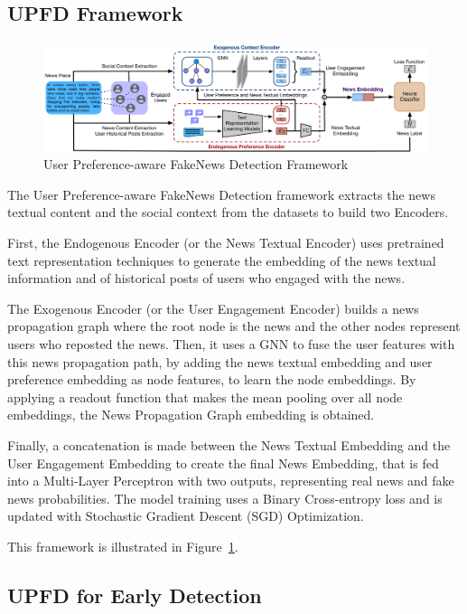 \documentclass[12pt]{article}
\begin{document}
\subsection{UPFD Framework}

\begin{figure}
    \centering
    \includegraphics[width=\textwidth]{upfd_framework.pdf}
    \caption{User Preference-aware FakeNews Detection Framework}
    \label{fig:upfd_framework}
\end{figure}

The User Preference-aware FakeNews Detection framework extracts the 
news textual content and the social context from the datasets to build two Encoders. 

First, the Endogenous Encoder (or the News Textual Encoder) uses pretrained text representation techniques 
to generate the embedding of the news textual information and of historical posts of users who engaged with the news.

The Exogenous Encoder (or the User Engagement Encoder) builds a news propagation graph 
where the root node is the news and the other nodes represent users who reposted the news.
Then, it uses a GNN to fuse the user features with this news propagation path, 
by adding the news textual embedding and user preference embedding as node features, 
to learn the node embeddings. 
By applying a readout function that makes the mean pooling over all node embeddings, 
the News Propagation Graph embedding is obtained.

Finally, a concatenation is made between the News Textual Embedding and the User Engagement Embedding
to create the final News Embedding, that is fed into a Multi-Layer Perceptron with two outputs, representing
real news and fake news probabilities. 
The model training uses a Binary Cross-entropy loss and is updated with Stochastic Gradient Descent (SGD) Optimization.

This framework is illustrated in Figure~\ref{fig:upfd_framework}. 

\subsection{UPFD for Early Detection}
\end{document}

